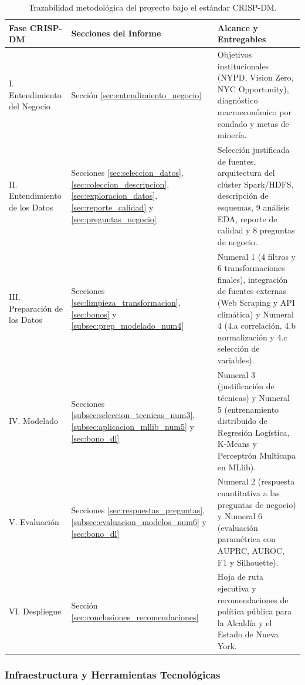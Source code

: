 \begin{table}[H]
\centering
\small
\renewcommand{\arraystretch}{1.25}
\begin{tabularx}{\textwidth}{p{3.6cm} p{3.8cm} X}
\toprule
\textbf{Fase CRISP-DM} & \textbf{Secciones del Informe} & \textbf{Alcance y Entregables} \\
\midrule
I. Entendimiento del Negocio & Sección \ref{sec:entendimiento_negocio} & Objetivos institucionales (NYPD, Vision Zero, NYC Opportunity), diagnóstico macroeconómico por condado y metas de minería. \\
II. Entendimiento de los Datos & Secciones \ref{sec:seleccion_datos}, \ref{sec:coleccion_descripcion}, \ref{sec:exploracion_datos}, \ref{sec:reporte_calidad} y \ref{sec:preguntas_negocio} & Selección justificada de fuentes, arquitectura del clúster Spark/HDFS, descripción de esquemas, 9 análisis EDA, reporte de calidad y 8 preguntas de negocio. \\
III. Preparación de los Datos & Secciones \ref{sec:limpieza_transformacion}, \ref{sec:bonos} y \ref{subsec:prep_modelado_num4} & Numeral 1 (4 filtros y 6 transformaciones finales), integración de fuentes externas (Web Scraping y API climática) y Numeral 4 (4.a correlación, 4.b normalización y 4.c selección de variables). \\
IV. Modelado & Secciones \ref{subsec:seleccion_tecnicas_num3}, \ref{subsec:aplicacion_mllib_num5} y \ref{sec:bono_dl} & Numeral 3 (justificación de técnicas) y Numeral 5 (entrenamiento distribuido de Regresión Logística, K-Means y Perceptrón Multicapa en MLlib). \\
V. Evaluación & Secciones \ref{sec:respuestas_preguntas}, \ref{subsec:evaluacion_modelos_num6} y \ref{sec:bono_dl} & Numeral 2 (respuesta cuantitativa a las preguntas de negocio) y Numeral 6 (evaluación paramétrica con AUPRC, AUROC, F1 y Silhouette). \\
VI. Despliegue & Sección \ref{sec:conclusiones_recomendaciones} & Hoja de ruta ejecutiva y recomendaciones de política pública para la Alcaldía y el Estado de Nueva York. \\
\bottomrule
\end{tabularx}
\caption{Trazabilidad metodológica del proyecto bajo el estándar CRISP-DM.}
\label{tab:plan_crispdm}
\end{table}

\subsubsection{Infraestructura y Herramientas Tecnológicas}

